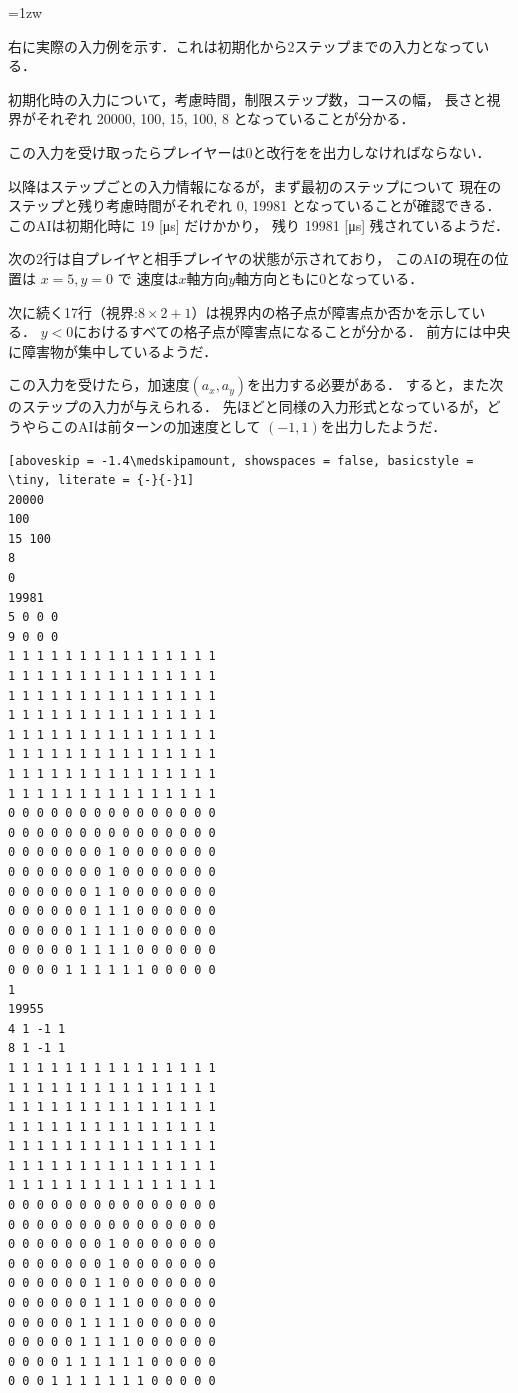\documentclass[11pt]{jarticle}
\begin{document}
\begin{minipage}[t]{.6\textwidth}

\parindent=1zw

右に実際の入力例を示す．これは初期化から2ステップまでの入力となっている．

初期化時の入力について，考慮時間，制限ステップ数，コースの幅，
長さと視界がそれぞれ 20000, 100, 15, 100, 8
となっていることが分かる．

この入力を受け取ったらプレイヤーは0と改行をを出力しなければならない．

以降はステップごとの入力情報になるが，まず最初のステップについて
現在のステップと残り考慮時間がそれぞれ 0, 19981
となっていることが確認できる．このAIは初期化時に 19 [\si{\micro \second}] だけかかり，
残り 19981 [\si{\micro \second}] 残されているようだ．

次の2行は自プレイヤと相手プレイヤの状態が示されており，
このAIの現在の位置は $x = 5, y = 0$ で
速度は$x$軸方向$y$軸方向ともに0となっている．

次に続く17行（$\text{視界:}8 \times 2 + 1$）は視界内の格子点が障害点か否かを示している．
$y < 0$におけるすべての格子点が障害点になることが分かる．
前方には中央に障害物が集中しているようだ．

この入力を受けたら，加速度$(a_x, a_y)$を出力する必要がある．
すると，また次のステップの入力が与えられる．
先ほどと同様の入力形式となっているが，どうやらこのAIは前ターンの加速度として
$(-1, 1)$を出力したようだ．

\end{minipage}
\hfill
\begin{minipage}[t]{.3\textwidth}
\begin{lstlisting}[aboveskip = -1.4\medskipamount, showspaces = false, basicstyle = \tiny, literate = {-}{-}1]
20000
100
15 100
8
0
19981
5 0 0 0
9 0 0 0
1 1 1 1 1 1 1 1 1 1 1 1 1 1 1
1 1 1 1 1 1 1 1 1 1 1 1 1 1 1
1 1 1 1 1 1 1 1 1 1 1 1 1 1 1
1 1 1 1 1 1 1 1 1 1 1 1 1 1 1
1 1 1 1 1 1 1 1 1 1 1 1 1 1 1
1 1 1 1 1 1 1 1 1 1 1 1 1 1 1
1 1 1 1 1 1 1 1 1 1 1 1 1 1 1
1 1 1 1 1 1 1 1 1 1 1 1 1 1 1
0 0 0 0 0 0 0 0 0 0 0 0 0 0 0
0 0 0 0 0 0 0 0 0 0 0 0 0 0 0
0 0 0 0 0 0 0 1 0 0 0 0 0 0 0
0 0 0 0 0 0 0 1 0 0 0 0 0 0 0
0 0 0 0 0 0 1 1 0 0 0 0 0 0 0
0 0 0 0 0 0 1 1 1 0 0 0 0 0 0
0 0 0 0 0 1 1 1 1 0 0 0 0 0 0
0 0 0 0 0 1 1 1 1 0 0 0 0 0 0
0 0 0 0 1 1 1 1 1 1 0 0 0 0 0
1
19955
4 1 -1 1
8 1 -1 1
1 1 1 1 1 1 1 1 1 1 1 1 1 1 1
1 1 1 1 1 1 1 1 1 1 1 1 1 1 1
1 1 1 1 1 1 1 1 1 1 1 1 1 1 1
1 1 1 1 1 1 1 1 1 1 1 1 1 1 1
1 1 1 1 1 1 1 1 1 1 1 1 1 1 1
1 1 1 1 1 1 1 1 1 1 1 1 1 1 1
1 1 1 1 1 1 1 1 1 1 1 1 1 1 1
0 0 0 0 0 0 0 0 0 0 0 0 0 0 0
0 0 0 0 0 0 0 0 0 0 0 0 0 0 0
0 0 0 0 0 0 0 1 0 0 0 0 0 0 0
0 0 0 0 0 0 0 1 0 0 0 0 0 0 0
0 0 0 0 0 0 1 1 0 0 0 0 0 0 0
0 0 0 0 0 0 1 1 1 0 0 0 0 0 0
0 0 0 0 0 1 1 1 1 0 0 0 0 0 0
0 0 0 0 0 1 1 1 1 0 0 0 0 0 0
0 0 0 0 1 1 1 1 1 1 0 0 0 0 0
0 0 0 1 1 1 1 1 1 1 0 0 0 0 0
\end{lstlisting}
\end{minipage}
\end{document}
